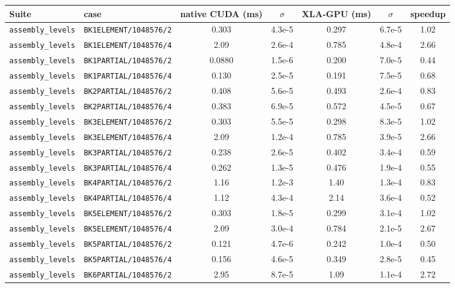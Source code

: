 \begin{tabular}{ll S[table-format=3.4e-1] S[table-format=1.2e-1] S[table-format=3.4e-1] S[table-format=1.2e-1] S[table-format=2.2]}
\toprule
Suite & case & {native CUDA (ms)} & {$\sigma$} & {XLA-GPU (ms)} & {$\sigma$} & {speedup} \\
\midrule
\texttt{assembly\_levels} & \texttt{BK1ELEMENT/1048576/2} & 0.303 & 4.3e-5 & 0.297 & 6.7e-5 & 1.02 \\
\texttt{assembly\_levels} & \texttt{BK1ELEMENT/1048576/4} & 2.09 & 2.6e-4 & 0.785 & 4.8e-4 & 2.66 \\
\texttt{assembly\_levels} & \texttt{BK1PARTIAL/1048576/2} & 0.0880 & 1.5e-6 & 0.200 & 7.0e-5 & 0.44 \\
\texttt{assembly\_levels} & \texttt{BK1PARTIAL/1048576/4} & 0.130 & 2.5e-5 & 0.191 & 7.5e-5 & 0.68 \\
\texttt{assembly\_levels} & \texttt{BK2PARTIAL/1048576/2} & 0.408 & 5.6e-5 & 0.493 & 2.6e-4 & 0.83 \\
\texttt{assembly\_levels} & \texttt{BK2PARTIAL/1048576/4} & 0.383 & 6.9e-5 & 0.572 & 4.5e-5 & 0.67 \\
\texttt{assembly\_levels} & \texttt{BK3ELEMENT/1048576/2} & 0.303 & 5.5e-5 & 0.298 & 8.3e-5 & 1.02 \\
\texttt{assembly\_levels} & \texttt{BK3ELEMENT/1048576/4} & 2.09 & 1.2e-4 & 0.785 & 3.9e-5 & 2.66 \\
\texttt{assembly\_levels} & \texttt{BK3PARTIAL/1048576/2} & 0.238 & 2.6e-5 & 0.402 & 3.4e-4 & 0.59 \\
\texttt{assembly\_levels} & \texttt{BK3PARTIAL/1048576/4} & 0.262 & 1.3e-5 & 0.476 & 1.9e-4 & 0.55 \\
\texttt{assembly\_levels} & \texttt{BK4PARTIAL/1048576/2} & 1.16 & 1.2e-3 & 1.40 & 1.3e-4 & 0.83 \\
\texttt{assembly\_levels} & \texttt{BK4PARTIAL/1048576/4} & 1.12 & 4.3e-4 & 2.14 & 3.6e-4 & 0.52 \\
\texttt{assembly\_levels} & \texttt{BK5ELEMENT/1048576/2} & 0.303 & 1.8e-5 & 0.299 & 3.1e-4 & 1.02 \\
\texttt{assembly\_levels} & \texttt{BK5ELEMENT/1048576/4} & 2.09 & 3.0e-4 & 0.784 & 2.1e-5 & 2.67 \\
\texttt{assembly\_levels} & \texttt{BK5PARTIAL/1048576/2} & 0.121 & 4.7e-6 & 0.242 & 1.0e-4 & 0.50 \\
\texttt{assembly\_levels} & \texttt{BK5PARTIAL/1048576/4} & 0.156 & 4.6e-5 & 0.349 & 2.8e-5 & 0.45 \\
\texttt{assembly\_levels} & \texttt{BK6PARTIAL/1048576/2} & 2.95 & 8.7e-5 & 1.09 & 1.1e-4 & 2.72 \\

\end{tabular}
